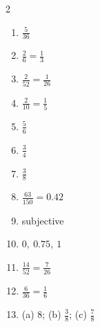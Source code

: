 \documentclass[11pt]{article}
\begin{document}
\begin{keybox}
\begin{multicols}{2}
\small
\begin{enumerate}[leftmargin=*,itemsep=3pt]
  \item $\tfrac{5}{36}$
  \item $\tfrac26=\tfrac13$
  \item $\tfrac{2}{52}=\tfrac{1}{26}$
  \item $\tfrac{2}{10}=\tfrac15$
  \item $\tfrac56$
  \item $\tfrac34$
  \item $\tfrac38$
  \item $\tfrac{63}{150}=0.42$
  \item subjective
  \item $0,\ 0.75,\ 1$
  \item $\tfrac{14}{52}=\tfrac{7}{26}$
  \item $\tfrac{6}{36}=\tfrac16$
  \item (a) $8$; (b) $\tfrac38$; (c) $\tfrac78$
\end{enumerate}
\end{multicols}
\end{keybox}
\end{document}
